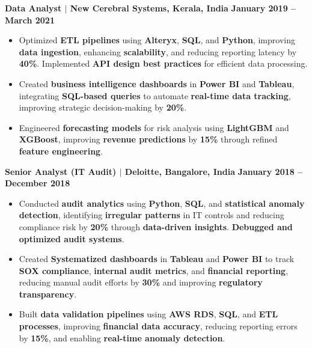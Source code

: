 \documentclass{article}
\begin{document}
\vspace{1mm}
\noindent \textbf{Data Analyst $\mid$ New Cerebral Systems, Kerala, India} \hfill \textbf{January 2019 -- March 2021}
\begin{itemize}[noitemsep, nolistsep, leftmargin=*]
    \item Optimized \textbf{ETL pipelines} using \textbf{Alteryx}, \textbf{SQL}, and \textbf{Python}, improving \textbf{data ingestion}, enhancing \textbf{scalability}, and reducing reporting latency by \textbf{40\%}. Implemented \textbf{API design best practices} for efficient data processing.
    \item Created \textbf{business intelligence dashboards} in \textbf{Power BI} and \textbf{Tableau}, integrating \textbf{SQL-based queries} to automate \textbf{real-time data tracking}, improving strategic decision-making by \textbf{20\%}.
    \item Engineered \textbf{forecasting models} for risk analysis using \textbf{LightGBM} and \textbf{XGBoost}, improving \textbf{revenue predictions} by \textbf{15\%} through refined \textbf{feature engineering}.
\end{itemize}

\vspace{1mm}
\noindent \textbf{Senior Analyst (IT Audit) $\mid$ Deloitte, Bangalore, India} \hfill \textbf{January 2018 -- December 2018}
\begin{itemize}[noitemsep, nolistsep, leftmargin=*]
    \item Conducted \textbf{audit analytics} using \textbf{Python}, \textbf{SQL}, and \textbf{statistical anomaly detection}, identifying \textbf{irregular patterns} in IT controls and reducing compliance risk by \textbf{20\%} through \textbf{data-driven insights}. \textbf{Debugged and optimized audit systems}.
    \item Created \textbf{Systematized dashboards} in \textbf{Tableau} and \textbf{Power BI} to track \textbf{SOX compliance}, \textbf{internal audit metrics}, and \textbf{financial reporting}, reducing manual audit efforts by \textbf{30\%} and improving \textbf{regulatory transparency}.
    \item Built \textbf{data validation pipelines} using \textbf{AWS RDS}, \textbf{SQL}, and \textbf{ETL processes}, improving \textbf{financial data accuracy}, reducing reporting errors by \textbf{15\%}, and enabling \textbf{real-time anomaly detection}.
\end{itemize}
\end{document}
